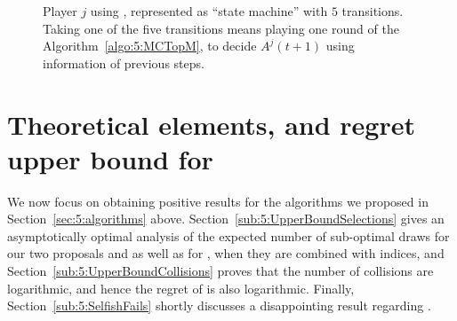 \begin{figure}[h!]
  \caption[``State-machine'' representation of \MCTopM]{Player $j$ using \MCTopM, represented as ``state machine'' with $5$ transitions.
  Taking one of the five transitions means playing one round of the Algorithm~\ref{algo:5:MCTopM}, to decide $A^j(t+1)$ using information of previous steps.}
  \label{fig:5:StateMachineAlgorithm_MCTopM}
\end{figure}



\section{Theoretical elements, and regret upper bound for \MCTopM}
\label{sec:5:upperbounds}

We now focus on obtaining positive results for the algorithms we proposed in Section~\ref{sec:5:algorithms} above.
Section~\ref{sub:5:UpperBoundSelections} gives
an asymptotically optimal analysis of the expected number of sub-optimal draws
for our two proposals \RandTopM{} and \MCTopM{} as well as for \rhoRand{}, when they are combined with \klUCB{} indices,
and Section~\ref{sub:5:UpperBoundCollisions} proves that the number of collisions are logarithmic, and hence the regret of \MCTopM{} is also logarithmic.
%
Finally, Section~\ref{sub:5:SelfishFails} shortly discusses a disappointing result regarding \Selfish.


